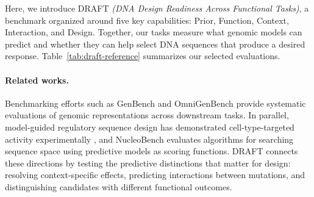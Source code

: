 Here, we introduce DRAFT \textsl{(DNA Design Readiness Across Functional Tasks)}, a benchmark organized around five key capabilities: %
\textcolor{capSequencePriors}{Prior},
\textcolor{capFunctionalPrediction}{Function},
\textcolor{capBiologicalContext}{Context},
\textcolor{capGeneticInteractions}{Interaction}, and
\textcolor{capGenomicDesign}{Design}.
Together, our tasks measure what genomic models can predict and whether they can help select DNA sequences that produce a desired response. Table~\ref{tab:draft-reference} summarizes our selected evaluations.



\paragraph{Related works.}


Benchmarking efforts such as GenBench \citep{liu2024genbench} and OmniGenBench \citep{yang2025omnigenbench} provide systematic evaluations of genomic representations across downstream tasks. In parallel, model-guided regulatory sequence design has demonstrated cell-type-targeted activity experimentally \citep{gosai2024design,yin2025enhancer,castillohair2025atlas}, and NucleoBench \citep{shor2025nucleobench} evaluates algorithms for searching sequence space using predictive models as scoring functions. DRAFT connects these directions by testing the predictive distinctions that matter for design: resolving context-specific effects, predicting interactions between mutations, and distinguishing candidates with different functional outcomes. %












